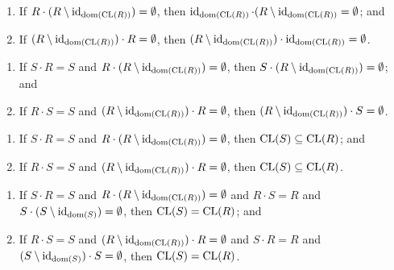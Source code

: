 \documentclass{article}
\begin{document}
\begin{thm}
\item\label{sysrel:37} 
  \begin{enumerate}[label=(\roman*)]
  \item If $R\cdot(R\setminus\operatorname{id}_{\operatorname{dom}(\operatorname{CL}(R))})=\emptyset$,
    then $\operatorname{id}_{\operatorname{dom}(\operatorname{CL}(R))}\cdot(R\setminus\operatorname{id}_{\operatorname{dom}(\operatorname{CL}(R))}=\emptyset$; and
  \item If $(R\setminus\operatorname{id}_{\operatorname{dom}(\operatorname{CL}(R))})\cdot R=\emptyset$,
    then $(R\setminus\operatorname{id}_{\operatorname{dom}(\operatorname{CL}(R))})\cdot\operatorname{id}_{\operatorname{dom}(\operatorname{CL}(R))}=\emptyset$.
  \end{enumerate}
\item\label{sysrel:38} 
  \begin{enumerate}[label=(\roman*)]
  \item If $S\cdot R=S$ and $R\cdot(R\setminus\operatorname{id}_{\operatorname{dom}(\operatorname{CL}(R))})=\emptyset$,
    then $S\cdot(R\setminus\operatorname{id}_{\operatorname{dom}(\operatorname{CL}(R))})=\emptyset$; and
  \item If $R\cdot S=S$ and $(R\setminus\operatorname{id}_{\operatorname{dom}(\operatorname{CL}(R))})\cdot R=\emptyset$,
    then $(R\setminus\operatorname{id}_{\operatorname{dom}(\operatorname{CL}(R))})\cdot S=\emptyset$.
  \end{enumerate}
\item\label{sysrel:39} 
  \begin{enumerate}[label=(\roman*)]
  \item If $S\cdot R=S$ and $R\cdot(R\setminus\operatorname{id}_{\operatorname{dom}(\operatorname{CL}(R))})=\emptyset$,
    then $\operatorname{CL}(S)\subseteq\operatorname{CL}(R)$; and
  \item If $R\cdot S=S$ and $(R\setminus\operatorname{id}_{\operatorname{dom}(\operatorname{CL}(R))})\cdot R=\emptyset$,
    then $\operatorname{CL}(S)\subseteq\operatorname{CL}(R)$.
  \end{enumerate}
\item\label{sysrel:40} 
  \begin{enumerate}[label=(\roman*)]
  \item If $S\cdot R=S$ and $R\cdot(R\setminus\operatorname{id}_{\operatorname{dom}(\operatorname{CL}(R))})=\emptyset$
    and $R\cdot S=R$ and $S\cdot(S\setminus\operatorname{id}_{\operatorname{dom}(S)})=\emptyset$,
    then $\operatorname{CL}(S)=\operatorname{CL}(R)$; and
  \item If $R\cdot S=S$ and $(R\setminus\operatorname{id}_{\operatorname{dom}(\operatorname{CL}(R))})\cdot R=\emptyset$
    and $S\cdot R=R$ and $(S\setminus\operatorname{id}_{\operatorname{dom}(S)})\cdot S=\emptyset$,
    then $\operatorname{CL}(S) = \operatorname{CL}(R)$.
  \end{enumerate}
\end{thm}
\end{document}
